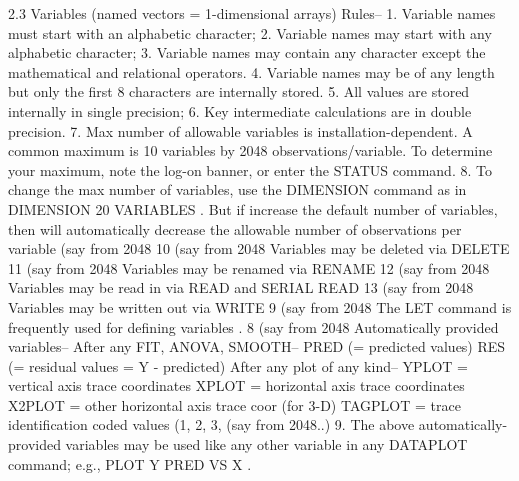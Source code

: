 2.3
Variables (named vectors = 1-dimensional arrays)
   Rules--
      1. Variable names must start with an alphabetic character;
      2. Variable names may start with any alphabetic character;
      3. Variable names may contain any character except
         the mathematical and relational operators.
      4. Variable names may be of any length but only the
         first 8 characters are internally stored.
      5. All values are stored internally in single precision;
      6. Key intermediate calculations are in double precision.
      7. Max number of allowable variables is
         installation-dependent.  A common maximum is
         10 variables by 2048 observations/variable.
         To determine your maximum, note the log-on banner,
         or enter the STATUS command.
     8. To change the max number of variables, use the
        DIMENSION command as in DIMENSION 20 VARIABLES .
        But if increase the default number of variables,
        then will automatically decrease the allowable
        number of observations per variable (say from 2048
     10 (say from 2048 Variables may be deleted via DELETE
     11 (say from 2048 Variables may be renamed via RENAME
     12 (say from 2048 Variables may be read in via READ and SERIAL READ
     13 (say from 2048 Variables may be written out via WRITE
      9 (say from 2048 The LET command is frequently used for defining variables
.
      8 (say from 2048 Automatically provided variables--
            After any FIT, ANOVA, SMOOTH--
               PRED (= predicted values)
               RES (= residual values = Y - predicted)
            After any plot of any kind--
               YPLOT = vertical axis trace coordinates
               XPLOT = horizontal axis trace coordinates
               X2PLOT = other horizontal axis trace coor (for 3-D)
               TAGPLOT = trace identification coded values (1, 2, 3,  (say from
2048..)
      9. The above automatically-provided variables may
         be used like any other variable in any DATAPLOT
         command; e.g., PLOT Y PRED VS X   .
 
 
 
 
 
 
 
 
 
 
 
 
 
 
 
 
 
 
 
 
 
 
 
 
 

